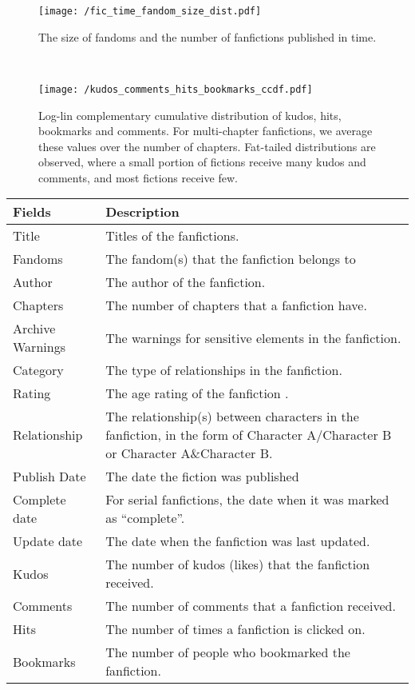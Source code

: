 \documentclass[letterpaper]{article} %
\begin{document}
\begin{figure*}
    \centering
    \begin{subfigure}[b]{\textwidth}
    \hspace{2cm}
        \texttt{[image: /fic\_time\_fandom\_size\_dist.pdf]}
        \caption{The size of fandoms and the number of fanfictions published in time.}
        \label{fig:fandom_size}
    \end{subfigure}
    ~ %
    \begin{subfigure}[b]{\textwidth}
            \texttt{[image: /kudos\_comments\_hits\_bookmarks\_ccdf.pdf]}
        \caption{Log-lin complementary cumulative distribution of kudos, hits, bookmarks and comments. For multi-chapter fanfictions, we average these values over the number of chapters. Fat-tailed distributions are observed, where a small portion of fictions receive many kudos and comments, and most fictions receive few.}
        \label{fig:kudos_dist}
    \end{subfigure}
\end{figure*}


\begin{table*}
\centering
\begin{tabular}[width=0.8\textwidth]{p{3cm}p{10cm}}
\toprule
Fields & Description \\ 
   \hline			
Title & Titles of the fanfictions.  \\
Fandoms & The fandom(s) that the fanfiction belongs to \\
Author & The author of the fanfiction.  \\
Chapters & The number of chapters that a fanfiction have. \\
Archive Warnings & The warnings for sensitive elements in the fanfiction. \\
Category & The type of relationships in the fanfiction. \\
Rating & The age rating of the fanfiction . \\
Relationship & The relationship(s) between characters in the fanfiction, in the form of Character A/Character B
or Character A\&Character B. \\
Publish Date & The date the fiction was published \\
Complete date & For serial fanfictions, the date when it was marked as ``complete''.\\
Update date & The date when the fanfiction was last updated. \\
\hline
Kudos & The number of kudos (likes) that the fanfiction received. \\
Comments & The number of comments that a fanfiction received.\\
Hits & The number of times a fanfiction is clicked on. \\
Bookmarks & The number of people who bookmarked the fanfiction.\\

\bottomrule
\end{tabular}
\caption{Metadata fields of the fanfictions.}
\label{tab:metadata}
\end{table*}%
\end{document}
